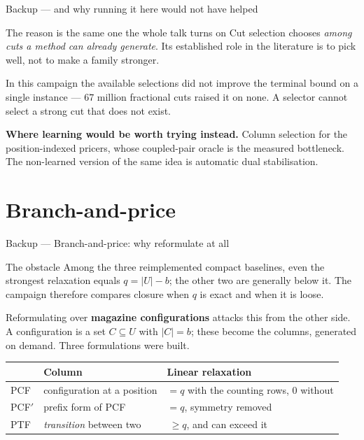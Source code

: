 \documentclass[aspectratio=169,10pt]{beamer}
\newcommand{\U}{U}
\begin{document}
\begin{frame}{Backup --- and why running it here would not have helped}
\vspace{0.3cm}
\begin{block}{The reason is the same one the whole talk turns on}
Cut selection chooses \emph{among cuts a method can already generate}. Its established
role in the literature is to pick well, not to make a family stronger.
\end{block}

\vspace{0.3cm}
In this campaign the available selections did not improve the terminal bound on a single
instance --- $67$ million fractional cuts raised it on none. A selector cannot select a
strong cut that does not exist.

\vspace{0.3cm}
\textbf{Where learning would be worth trying instead.} Column selection for the
position-indexed pricers, whose coupled-pair oracle is the measured bottleneck. The
non-learned version of the same idea is automatic dual stabilisation.
\end{frame}

\section*{Branch-and-price}

\begin{frame}{Backup --- Branch-and-price: why reformulate at all}
\vspace{0.27cm}
\begin{block}{The obstacle}
Among the three reimplemented compact baselines, even the strongest relaxation equals
$q=\lvert\U\rvert-b$; the other two are generally below it. The campaign therefore
compares closure when $q$ is exact and when it is loose.
\end{block}

\vspace{0.3cm}
Reformulating over \textbf{magazine configurations} attacks this from the other side.
A configuration is a set $C\subseteq\U$ with $\lvert C\rvert=b$; these become the
columns, generated on demand. Three formulations were built.

\vspace{0.3cm}
\centering
\begin{tabular}{@{}lll@{}}
\toprule
& \textbf{Column} & \textbf{Linear relaxation}\\
\midrule
PCF        & configuration at a position & $=q$ with the counting rows, $0$ without\\
PCF$'$     & prefix form of PCF          & $=q$, symmetry removed\\
PTF        & \emph{transition} between two & $\ \ge q$, and can exceed it\\
\bottomrule
\end{tabular}
\end{frame}
\end{document}
